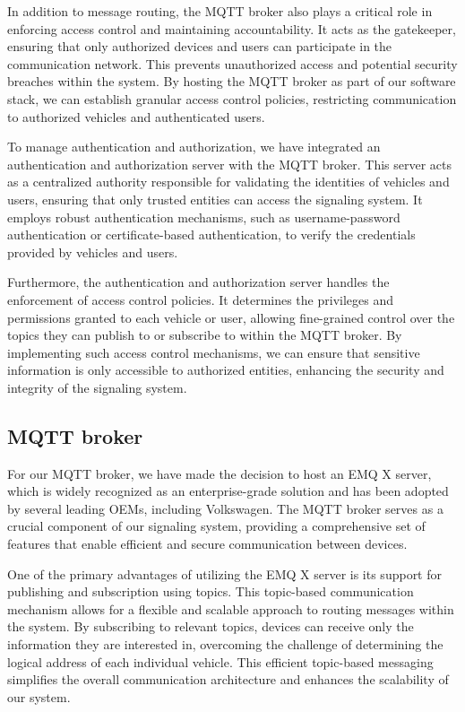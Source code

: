 \documentclass[
12pt,
oneside, 
onehalfspacing, 
nolistspacing, 
parskip, 
chapterinoneline, 
]{AASTCOMPUTER}
\begin{document}
In addition to message routing, the MQTT broker also plays a critical role in enforcing access control and maintaining accountability. It acts as the gatekeeper, ensuring that only authorized devices and users can participate in the communication network. This prevents unauthorized access and potential security breaches within the system. By hosting the MQTT broker as part of our software stack, we can establish granular access control policies, restricting communication to authorized vehicles and authenticated users.

To manage authentication and authorization, we have integrated an authentication and authorization server with the MQTT broker. This server acts as a centralized authority responsible for validating the identities of vehicles and users, ensuring that only trusted entities can access the signaling system. It employs robust authentication mechanisms, such as username-password authentication or certificate-based authentication, to verify the credentials provided by vehicles and users.

Furthermore, the authentication and authorization server handles the enforcement of access control policies. It determines the privileges and permissions granted to each vehicle or user, allowing fine-grained control over the topics they can publish to or subscribe to within the MQTT broker. By implementing such access control mechanisms, we can ensure that sensitive information is only accessible to authorized entities, enhancing the security and integrity of the signaling system.

\subsection{MQTT broker}
For our MQTT broker, we have made the decision to host an EMQ X server, which is widely recognized as an enterprise-grade solution and has been adopted by several leading OEMs, including Volkswagen. The MQTT broker serves as a crucial component of our signaling system, providing a comprehensive set of features that enable efficient and secure communication between devices.

One of the primary advantages of utilizing the EMQ X server is its support for publishing and subscription using topics. This topic-based communication mechanism allows for a flexible and scalable approach to routing messages within the system. By subscribing to relevant topics, devices can receive only the information they are interested in, overcoming the challenge of determining the logical address of each individual vehicle. This efficient topic-based messaging simplifies the overall communication architecture and enhances the scalability of our system.
\end{document}
